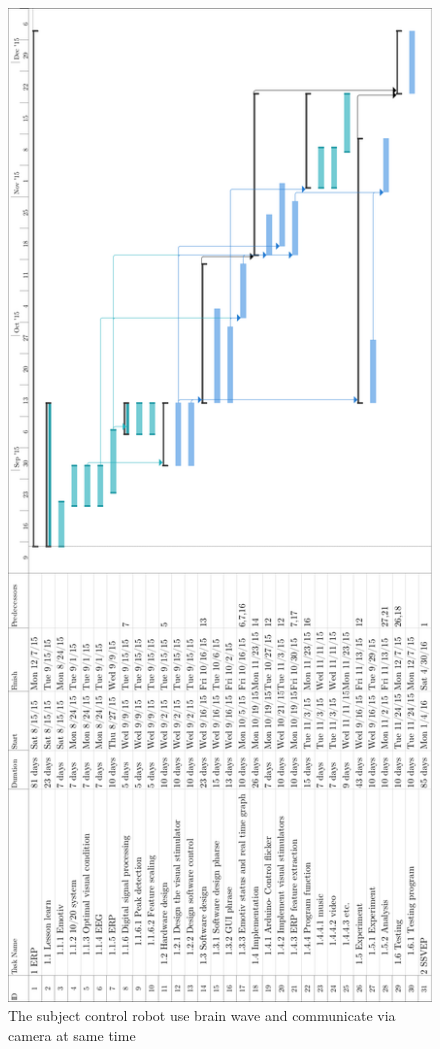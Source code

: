 \newpage

\begin{figure}[ht]
	\centering
	\includegraphics[scale = 0.4]{chapter1/gan1.pdf}
	\caption{The subject control robot use brain wave and communicate via camera at same time}
\end{figure}

